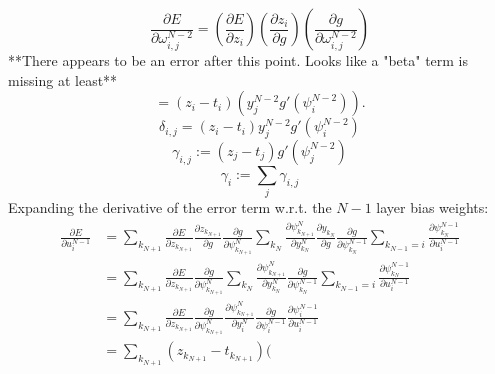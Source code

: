 \documentclass{article}
\begin{document}
%
\begin{equation} \label{eq:last_layer_derror}
\frac{\partial E}{\partial \omega_{i,j}^{N-2}} =
\left( \frac{\partial E}{\partial z_i} \right) \left( \frac{\partial z_i}{\partial g} \right) \left ( \frac{\partial g}{\partial \omega_{i, j}^{N-2}} \right )
\end{equation}
%
**There appears to be an error after this point. Looks like a "beta" term is missing at least**
%
\begin{equation} \label{eq:last_layer_derror3}
=
\left( z_i - t_i \right) \left( y_j^{N-2} g' (\psi_i^{N-2}) \right).
\end{equation}
%
\begin{equation} \label{eq:delta_full}
\delta_{i,j} = 
\left ( z_i - t_i \right ) y_j^{N-2} g' (\psi_i^{N-2})
\end{equation}
%
\begin{equation} \label{eq:gamma}
\gamma_{i,j} := (z_j - t_j) g'(\psi_j^{N-2})
\end{equation}
%
\begin{equation} \label{eq:gamma_array}
\gamma_i := \sum_j \gamma_{i,j}
\end{equation}
%
Expanding the derivative of the error term w.r.t. the $N-1$ layer bias weights:
%
\begin{equation} \label{eq:derive_du_nm1}
\begin{aligned}
\frac{\partial E}{\partial u_i^{N-1}} &= 
\sum_{k_{N+1}} \frac{\partial E}{\partial z_{k_{N+1}}} \frac{\partial z_{k_{N+1}}}{\partial g} \frac{\partial g}{\partial \psi_{k_{N+1}}^N} \sum_{k_N} \frac{\partial \psi_{k_{N+1}}^N}{\partial y_{k_N}^N} \frac{\partial y_{k_{N}}}{\partial g} \frac{\partial g}{\partial \psi_{k_N}^{N-1}} \sum_{k_{N-1}=i} \frac{\partial \psi_{k_N}^{N-1}}{\partial u_i^{N-1}} \\
& = \sum_{k_{N+1}} \frac{\partial E}{\partial z_{k_{N+1}}} \frac{\partial g}{\partial \psi_{k_{N+1}}^N} \sum_{k_N} \frac{\partial \psi_{k_{N+1}}^N}{\partial y_{k_N}^N} \frac{\partial g}{\partial \psi_{k_N}^{N-1}} \sum_{k_{N-1}=i} \frac{\partial \psi_{k_N}^{N-1}}{\partial u_i^{N-1}} \\
& = \sum_{k_{N+1}} \frac{\partial E}{\partial z_{k_{N+1}}} \frac{\partial g}{\partial \psi_{k_{N+1}}^N} \frac{\partial \psi_{k_{N+1}}^N}{\partial y_i^N} \frac{\partial g}{\partial \psi_i^{N-1}} \frac{\partial \psi_i^{N-1}}{\partial u_i^{N-1}} \\
& = \sum_{k_{N+1}} (z_{k_{N+1}} - t_{k_{N+1}}) (
\end{aligned}
\end{equation}
\end{document}
